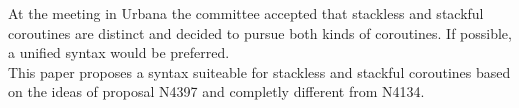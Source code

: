 At the meeting in Urbana the committee accepted that stackless and stackful
coroutines are distinct and decided to pursue both kinds of coroutines. If
possible, a unified syntax would be preferred.\\
This paper proposes a syntax suiteable for stackless and stackful coroutines
based on the ideas of proposal N4397\cite{N4397} and completly different from
N4134\cite{N4134}.\\
